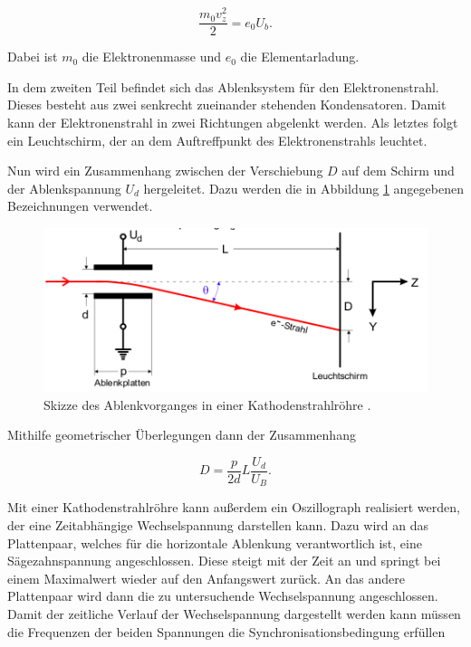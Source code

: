 \begin{equation*}
  \frac{m_0 v_z^2}{2} = e_0 U_b.
\end{equation*}

Dabei ist $m_0$ die Elektronenmasse und $e_0$ die Elementarladung.

In dem zweiten Teil befindet sich das Ablenksystem für den Elektronenstrahl. Dieses
besteht aus zwei senkrecht zueinander stehenden Kondensatoren. Damit kann der Elektronenstrahl
in zwei Richtungen abgelenkt werden.
Als letztes folgt ein Leuchtschirm, der an dem Auftreffpunkt des Elektronenstrahls
leuchtet.

Nun wird ein Zusammenhang zwischen der Verschiebung $D$ auf dem Schirm und der
Ablenkspannung $U_d$ hergeleitet. Dazu werden die in Abbildung \ref{abb:2} angegebenen
Bezeichnungen verwendet.

\begin{figure}[H]
  \centering
  \includegraphics[width=\textwidth]{content/Ablenkung.png}
  \caption{Skizze des Ablenkvorganges in einer Kathodenstrahlröhre \cite{1}.}
  \label{abb:2}
\end{figure}

Mithilfe geometrischer Überlegungen dann der Zusammenhang

\begin{equation}
  D = \frac{p}{2d} L \frac{U_d}{U_B}.
  \label{eq:1}
\end{equation}

Mit einer Kathodenstrahlröhre kann außerdem ein Oszillograph realisiert werden,
der eine Zeitabhängige Wechselspannung darstellen kann. Dazu wird an das Plattenpaar,
welches für die horizontale Ablenkung verantwortlich ist, eine Sägezahnspannung angeschlossen.
Diese steigt mit der Zeit an und springt bei einem Maximalwert wieder auf den Anfangswert
zurück. An das andere Plattenpaar wird dann die zu untersuchende Wechselspannung angeschlossen.
Damit der zeitliche Verlauf der Wechselspannung dargestellt werden kann müssen die
Frequenzen der beiden Spannungen die Synchronisationsbedingung erfüllen

